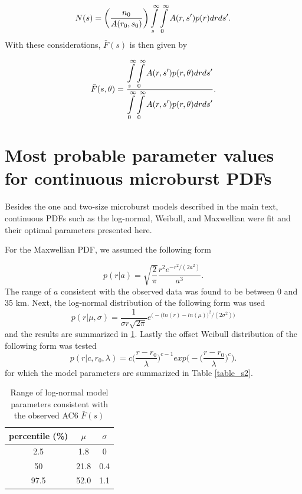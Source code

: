 \documentclass[draft]{agujournal2019}
\begin{document}
\begin{equation}
N(s) = \bigg( \frac{n_0}{A(r_0, s_0)} \bigg) \displaystyle\int\displaylimits_{s}^{\infty} \displaystyle\int\displaylimits_0^{\infty} A(r, s') p(r) dr ds'.
\end{equation} With these considerations, $\bar{F}(s)$ is then given by 

\begin{equation} \label{analytic_integral}
\bar{F}(s, \theta) = \frac{\displaystyle\int\displaylimits_{s}^{\infty} \displaystyle\int\displaylimits_0^{\infty} A(r, s') p(r, \theta) dr ds'}{\displaystyle\int\displaylimits_{0}^{\infty} \displaystyle\int\displaylimits_0^{\infty} A(r, s') p(r, \theta) dr ds'}.
\end{equation}

\section{Most probable parameter values for continuous microburst PDFs} \label{appendixb}
Besides the one and two-size microburst models described in the main text, continuous PDFs such as the log-normal, Weibull, and Maxwellian were fit and their optimal parameters presented here.

For the Maxwellian PDF, we assumed the following form

\begin{equation}
p(r | a) = \sqrt{\frac{2}{\pi}} \frac{r^2 e^{-r^2/(2a^2)}}{a^3}.
\end{equation} The range of $a$ consistent with the observed data was found to be between 0 and 35 km. Next, the log-normal distribution of the following form was used
\begin{equation}
p(r | \mu, \sigma) = \frac{1}{\sigma r \sqrt{2 \pi}} e^{\Big( -\big( ln(r) - ln(\mu) \big)^2/(2 \sigma^2) \Big)}
\end{equation} and the results are summarized in \ref{table_s1}. Lastly the offset Weibull distribution of the following form was tested
\begin{equation}
p(r | c, r_0, \lambda) = c \bigg(\frac{r-r_0}{\lambda}\bigg)^{c-1} exp \Bigg(- \bigg(\frac{r-r_0}{\lambda}\bigg)^{c} \Bigg).
\end{equation} for which the model parameters are summarized in Table \ref{table_s2}.

\begin{table}[h]
\caption{Range of log-normal model parameters consistent with the observed AC6  $\bar{F}(s)$}
\label{table_s1}
\centering
\begin{tabular}{|c|c|c|}
\hline 
percentile (\%) & $\mu$ & $\sigma$ \\ 
\hline 
2.5 & 1.8 & 0 \\ 
\hline 
50 & 21.8 & 0.4 \\ 
\hline 
97.5 & 52.0 & 1.1 \\ 
\hline 
\end{tabular} 
\end{table}
\end{document}
